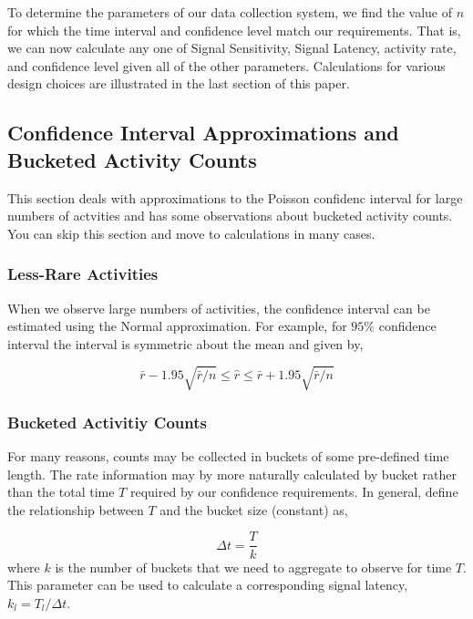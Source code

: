 \documentclass{article}
\begin{document}
To determine the parameters of our data collection system, we find the value of $n$ for which the time interval and confidence level match our requirements.  That is, we can now calculate any one of Signal Sensitivity, Signal Latency, activity rate, and confidence level given all of the other parameters. Calculations for various design choices are illustrated in the last section of this paper.

\subsection{Confidence Interval Approximations and Bucketed Activity Counts}

This section deals with approximations to the Poisson confidenc interval for large numbers of actvities and has some observations about bucketed activity counts. You can skip this section and move to calculations in many cases.


\subsubsection{Less-Rare Activities} 

When we observe large numbers of activities, the confidence interval can be estimated using the Normal approximation. For example, for $95\%$ confidence interval the interval is symmetric about the mean and given by,

\begin{equation}
    \label{eq:largenconf}
    \bar{r} - 1.95 \sqrt{\bar{r}/n} \leq \hat{r} \leq \bar{r} + 1.95 \sqrt{\bar{r}/n}
\end{equation}

\subsubsection{Bucketed Activitiy Counts}

For many reasons, counts may be collected in buckets of some pre-defined time length.  The rate information may by more naturally calculated by bucket rather than the total time $T$ required by our confidence requirements. In general, define the relationship between $T$ and the bucket size (constant) as,

\begin{equation}
    \label{eq:bucket}
    \Delta t = \frac{T}{k}
\end{equation}
where $k$ is the number of buckets that we need to aggregate to observe for time $T$. This parameter can be used to calculate a corresponding signal latency, $k_l = T_l/\Delta t$.
\end{document}
